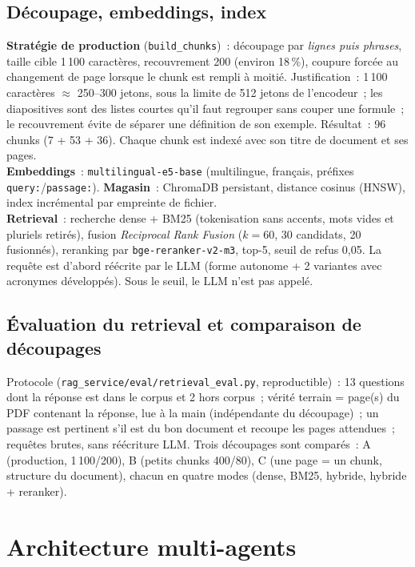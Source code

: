 \documentclass[11pt,a4paper]{article}
\newcommand{\code}[1]{\texttt{\small #1}}
\begin{document}
\subsection{D\'ecoupage, embeddings, index}
\textbf{Strat\'egie de production} (\code{build\_chunks})~: d\'ecoupage par \emph{lignes puis phrases}, taille cible 1\,100 caract\`eres, recouvrement 200 (environ 18\,\%), coupure forc\'ee au changement de page lorsque le chunk est rempli \`a moiti\'e. Justification~: 1\,100 caract\`eres $\approx$ 250--300 jetons, sous la limite de 512 jetons de l'encodeur~; les diapositives sont des listes courtes qu'il faut regrouper sans couper une formule~; le recouvrement \'evite de s\'eparer une d\'efinition de son exemple. R\'esultat~: 96 chunks (7 + 53 + 36). Chaque chunk est index\'e avec son titre de document et ses pages.\\
\textbf{Embeddings}~: \code{multilingual-e5-base} (multilingue, fran\c{c}ais, pr\'efixes \code{query:}/\code{passage:}). \textbf{Magasin}~: ChromaDB persistant, distance cosinus (HNSW), index incr\'emental par empreinte de fichier.\\
\textbf{Retrieval}~: recherche dense + BM25 (tokenisation sans accents, mots vides et pluriels retir\'es), fusion \emph{Reciprocal Rank Fusion} ($k=60$, 30 candidats, 20 fusionn\'es), reranking par \code{bge-reranker-v2-m3}, top-5, seuil de refus 0,05. La requ\^ete est d'abord r\'e\'ecrite par le LLM (forme autonome + 2 variantes avec acronymes d\'evelopp\'es). Sous le seuil, le LLM n'est pas appel\'e.

\subsection{\'Evaluation du retrieval et comparaison de d\'ecoupages}
Protocole (\code{rag\_service/eval/retrieval\_eval.py}, reproductible)~: 13 questions dont la r\'eponse est dans le corpus et 2 hors corpus~; v\'erit\'e terrain = page(s) du PDF contenant la r\'eponse, lue \`a la main (ind\'ependante du d\'ecoupage)~; un passage est pertinent s'il est du bon document et recoupe les pages attendues~; requ\^etes brutes, sans r\'e\'ecriture LLM. Trois d\'ecoupages sont compar\'es~: A (production, 1\,100/200), B (petits chunks 400/80), C (une page = un chunk, structure du document), chacun en quatre modes (dense, BM25, hybride, hybride + reranker).



\section{Architecture multi-agents}
\end{document}
